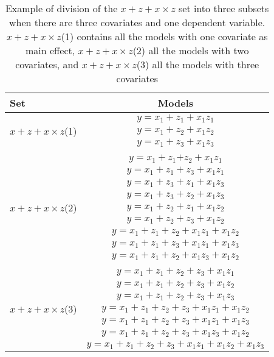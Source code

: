 \begin{table}[ht!]
\caption{Example of division of the $x + z + x \times z$ set into three subsets when there are three covariates and one dependent variable. $x + z + x \times z$(1) contains all the models with one covariate as main effect, $x + z + x \times z$(2) all the models with two covariates, and $x + z + x \times z$(3) all the models with three covariates}
\centering\label{tab:model2}
\begin{tabular}{lc}  
\toprule
Set & Models \\
\midrule
\multirow{3}{*}{$x + z + x \times z$(1)} & $y=x_1+z_1+x_1z_1$\\ & $y=x_1+z_2+x_1z_2$\\ & $y=x_1+z_3+x_1z_3$\\ & \\ 
\multirow{9}{*}{$x + z + x \times z$(2)} & $y=x_1+z_1$$+z_2+x_1z_1$\\ & $y=x_1+z_1+z_3+x_1z_1$\\ & $y=x_1+z_3+z_1+x_1z_3$\\ & $y=x_1+z_3+z_2+x_1z_3$\\ & $y=x_1+z_2+z_1+x_1z_2$\\ & $y=x_1+z_2+z_3+x_1z_2$\\ & $y=x_1+z_1+z_2+x_1z_1+x_1z_2$\\ & $y=x_1+z_1+z_3+x_1z_1+x_1z_3$\\ & $y=x_1+z_1+z_2+x_1z_3+x_1z_2$\\  & \\  
\multirow{7}{*}{$x + z + x \times z$(3)} & $y=x_1+z_1+z_2+z_3+x_1z_1$\\ & $y=x_1+z_1+z_2+z_3+x_1z_2$\\ & $y=x_1+z_1+z_2+z_3+x_1z_3$\\ & $y=x_1+z_1+z_2+z_3+x_1z_1+x_1z_2$\\ & $y=x_1+z_1+z_2+z_3+x_1z_1+x_1z_3$\\ & $y=x_1+z_1+z_2+z_3+x_1z_3+x_1z_2$\\ & $y=x_1+z_1+z_2+z_3+x_1z_1+x_1z_2+x_1z_3$\\  
\bottomrule
\end{tabular}
\end{table}


